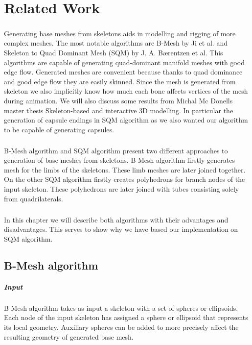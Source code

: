 \chapter{Related Work}
\paragraph{}
Generating base meshes from skeletons aids in modelling and rigging of more complex meshes. The most notable algorithms are B-Mesh\cite{ji_bm} by Ji et al. and Skeleton to Quad Dominant Mesh\cite{sqm} (SQM) by J. A. Bærentzen et al. This algorithms are capable of generating quad-dominant manifold meshes with good edge flow. Generated meshes are convenient because thanks to quad dominance and good edge flow they are easily skinned. Since the mesh is generated from skeleton we also implicitly know how much each bone affects vertices of the mesh during animation. We will also discuss some results from Michal Mc Donells master thesis Skeleton-based and interactive 3D modelling\cite{sqm_phd}. In particular the generation of capsule endings in SQM algorithm as we also wanted our algorithm to be capable of generating capsules.
\paragraph{}
B-Mesh algorithm and SQM algorithm present two different approaches to generation of base meshes from skeletons. B-Mesh algorithm firstly generates mesh for the limbs of the skeletons. These limb meshes are later joined together. On the other SQM algorithm firstly creates polyhedrons for branch nodes of the input skeleton. These polyhedrons are later joined with tubes consisting solely from quadrilaterals.
\paragraph{}
In this chapter we will describe both algorithms with their advantages and disadvantages. This serves to show why we have based our implementation on SQM algorithm.
\pagebreak

\section{B-Mesh algorithm}
\paragraph{Input}
B-Mesh algorithm takes as input a skeleton with a set of spheres or ellipsoids. Each node of the input skeleton has assigned a sphere or ellipsoid that represents its local geometry. Auxiliary spheres can be added to more precisely affect the resulting geometry of generated base mesh.
